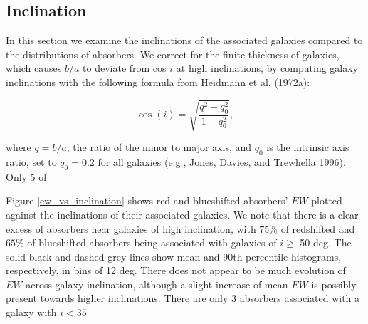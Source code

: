 \documentclass[iop]{emulateapj-rtx4}
\begin{document}
\subsection{Inclination}
In this section we examine the inclinations of the associated galaxies compared to the distributions of absorbers. We correct for the finite thickness of galaxies, which causes $b/a$ to deviate from cos $i$ at high inclinations, by computing galaxy inclinations with the following formula from Heidmann et al. (1972a):

\begin{equation}
	\cos(i) = \sqrt{\frac{q^2 - q_0^2}{1 - q_0^2}},
	\label{incEq}
\end{equation}

\noindent where $q = b/a$, the ratio of the minor to major axis, and $q_0$ is the intrinsic axis ratio, set to $q_0 = 0.2$ for all galaxies (e.g., Jones, Davies, and Trewhella 1996). Only 5 of 



Figure \ref{ew_vs_inclination} shows red and blueshifted absorbers' $EW$ plotted against the inclinations of their associated galaxies. We note that there is a clear excess of absorbers near galaxies of high inclination, with $75\%$ of redshifted and $65\%$ of blueshifted absorbers being associated with galaxies of $i \geq$ 50 deg. The solid-black and dashed-grey lines show mean and 90th percentile histograms, respectively, in bins of 12 deg. There does not appear to be much evolution of $EW$ across galaxy inclination, although a slight increase of mean $EW$ is possibly present towards higher inclinations. There are only 3 absorbers associated with a galaxy with $i<35$ 
\end{document}

